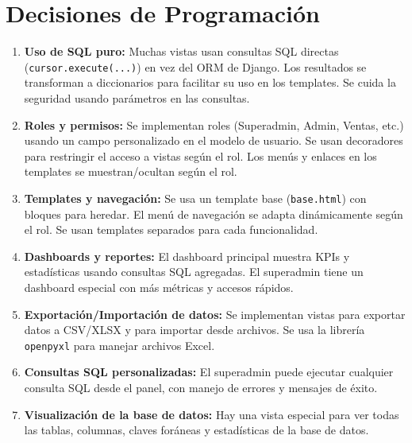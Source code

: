 \documentclass[12pt,a4paper]{article}
\begin{document}
\section{Decisiones de Programación}
\begin{enumerate}[label=\alph*)]
    \item \textbf{Uso de SQL puro:} Muchas vistas usan consultas SQL directas (\texttt{cursor.execute(...)}) en vez del ORM de Django. Los resultados se transforman a diccionarios para facilitar su uso en los templates. Se cuida la seguridad usando parámetros en las consultas.
    \item \textbf{Roles y permisos:} Se implementan roles (Superadmin, Admin, Ventas, etc.) usando un campo personalizado en el modelo de usuario. Se usan decoradores para restringir el acceso a vistas según el rol. Los menús y enlaces en los templates se muestran/ocultan según el rol.
    \item \textbf{Templates y navegación:} Se usa un template base (\texttt{base.html}) con bloques para heredar. El menú de navegación se adapta dinámicamente según el rol. Se usan templates separados para cada funcionalidad.
    \item \textbf{Dashboards y reportes:} El dashboard principal muestra KPIs y estadísticas usando consultas SQL agregadas. El superadmin tiene un dashboard especial con más métricas y accesos rápidos.
    \item \textbf{Exportación/Importación de datos:} Se implementan vistas para exportar datos a CSV/XLSX y para importar desde archivos. Se usa la librería \texttt{openpyxl} para manejar archivos Excel.
    \item \textbf{Consultas SQL personalizadas:} El superadmin puede ejecutar cualquier consulta SQL desde el panel, con manejo de errores y mensajes de éxito.
    \item \textbf{Visualización de la base de datos:} Hay una vista especial para ver todas las tablas, columnas, claves foráneas y estadísticas de la base de datos.
\end{enumerate}
\end{document}
